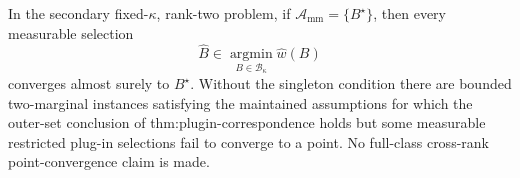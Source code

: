 In the secondary fixed-\(\kappa\), rank-two problem, if \(\mathcal A_{\mathrm{mm}}=\{B^\star\}\), then every measurable selection
\[
\widehat B\in\operatorname*{argmin}_{B\in\mathcal B_\kappa}\widehat w(B)
\]
converges almost surely to \(B^\star\).  Without the singleton condition there are bounded two-marginal instances satisfying the maintained assumptions for which the outer-set conclusion of thm:plugin-correspondence holds but some measurable restricted plug-in selections fail to converge to a point.  No full-class cross-rank point-convergence claim is made.